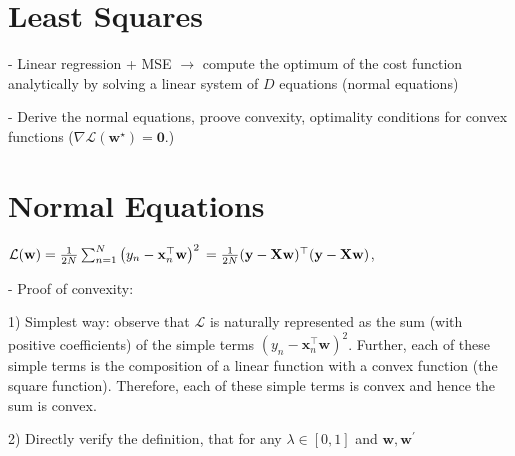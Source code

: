 
\section*{Least Squares}
- Linear regression + MSE $\rightarrow$ compute the optimum of the cost function analytically by solving a linear system of $D$ equations (normal equations)

- Derive the normal equations, proove convexity, optimality conditions for convex functions ($
\nabla \mathcal{L}\left(\mathbf{w}^{\star}\right)=\mathbf{0} .
$)

\section*{Normal Equations}
$\mathcal{L}(\mathbf{w})=\frac{1}{2 N} \sum_{n=1}^{N}\left(y_{n}-\mathbf{x}_{n}^{\top} \mathbf{w}\right)^{2}\\=\frac{1}{2 N}(\mathbf{y}-\mathbf{X} \mathbf{w})^{\top}(\mathbf{y}-\mathbf{X} \mathbf{w})$,



- Proof of convexity:

1) Simplest way: observe that $\mathcal{L}$ is naturally represented as the sum (with positive coefficients) of the simple terms $\left(y_{n}-\mathbf{x}_{n}^{\top} \mathbf{w}\right)^{2}$. Further, each of these simple terms is the composition of a linear function with a convex function (the square function). Therefore, each of these simple terms is convex and hence the sum is convex.

2) Directly verify the definition, that for any $\lambda \in[0,1]$ and $\mathbf{w}, \mathbf{w}^{\prime}$


